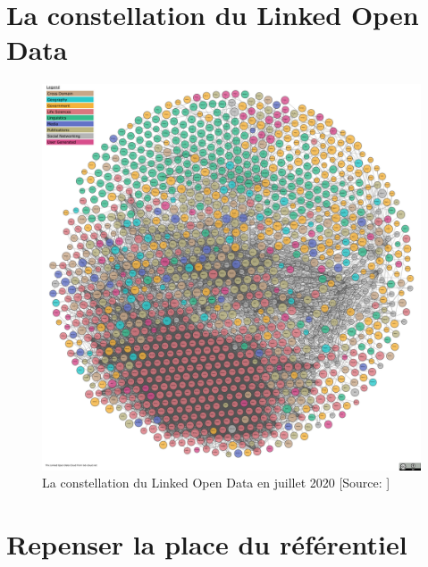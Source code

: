 

\chapter{\label{annexe_lod}La constellation du Linked Open Data}

\begin{figure}[!h]
	\centering
	\includegraphics[width=16cm]{images/lod-cloud-sm.jpg}
	\caption[La constellation du Linked Open Data en juillet 2020]{La constellation du Linked Open Data en juillet 2020 [Source: \cite{noauthor_linked_2020}]}
	\label{lod_cloud}
\end{figure}

\chapter{\label{annexe_nvx_modeles}Repenser la place du référentiel}

